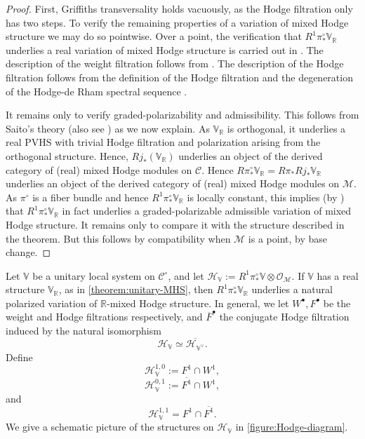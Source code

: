 \documentclass[12 pt]{amsart}
\theoremstyle{plain}
\theoremstyle{definition}
\theoremstyle{remark}
\numberwithin{equation}{section}
\begin{document}
\begin{proof}	
First, Griffiths transversality holds vacuously, as the Hodge filtration only has two steps. 
To verify the remaining properties of a variation of mixed Hodge structure
we may do so pointwise. 
Over a point, 
the verification that 
$R^1\pi^\circ_*\mathbb{V}_\mathbb{R}$ underlies a real variation of mixed Hodge
structure is carried out in 
\cite[Theorem, p. 152]{timmerscheidt:mixed-hodge-structure-for-unitary}.
The description of the weight filtration follows from \cite[Lemma
6.2]{timmerscheidt:mixed-hodge-structure-for-unitary}.
The description of the Hodge filtration follows from the definition of the
Hodge filtration and the degeneration of the Hodge-de Rham spectral sequence
\cite[Theorem 7.1(a)]{timmerscheidt:mixed-hodge-structure-for-unitary}.

It remains only to verify graded-polarizability and admissibility. This follows from Saito's theory \cite{saito1990mixed} (also see
\cite{schnell2014overview}) as we now explain. 
As $\mathbb{V}_\mathbb{R}$ is orthogonal, it underlies a real PVHS with trivial Hodge filtration and polarization arising from the orthogonal structure.
Hence, $Rj_*(\mathbb{V}_\mathbb{R})$ underlies an
object of the derived category of (real) mixed Hodge modules on $\mathscr{C}$. Hence
$R\pi^\circ_*\mathbb{V}_\mathbb{R}=R\pi_*Rj_*\mathbb{V}_\mathbb{R}$ 
underlies an object of the derived category of (real) mixed Hodge
modules on $\mathscr{M}$. As $\pi^\circ$ is a fiber bundle and hence $R^1\pi^\circ_*\mathbb{V}_\mathbb{R}$ is locally constant, this implies (by \cite[Theorem 21.1]{schnell2014overview}) that
$R^1\pi^\circ_*\mathbb{V}_\mathbb{R}$ in fact underlies a graded-polarizable
admissible variation of mixed Hodge structure. It remains only to compare it with
the structure described in the theorem. But this follows by compatibility
when $\mathscr{M}$ is a point, by base change.
\end{proof}
Let $\mathbb{V}$ be a unitary local system on $\mathscr{C}^\circ$, and let $\mathscr{H}_\mathbb{V}:=R^1\pi^\circ_*\mathbb{V}\otimes \mathscr{O}_\mathscr{M}$.   If $\mathbb{V}$ has a real structure $\mathbb{V}_\mathbb{R}$, as in \autoref{theorem:unitary-MHS}, then  $R^1\pi_*^\circ \mathbb{V}_\mathbb{R}$ underlies a natural polarized variation of $\mathbb{R}$-mixed Hodge structure. In general, we let $W^\bullet, F^\bullet$ be the weight and Hodge filtrations respectively, and $\overline{F}^\bullet$ the conjugate Hodge filtration induced by the natural isomorphism $$\mathscr{H}_{\mathbb{V}}\simeq \overline{\mathscr{H}_{\mathbb{V}^\vee}}.$$ Define $$\mathscr{H}_{\mathbb{V}}^{1,0}:= F^1\cap W^1,$$ $$\mathscr{H}^{0,1}_{\mathbb{V}} := \overline{F^1}\cap W^1,$$ and $$\mathscr{H}^{1,1}_{\mathbb{V}}=F^1\cap \overline{F^1}.$$ 
We give a schematic picture of the structures on $\mathscr{H}_{\mathbb{V}}$ in \autoref{figure:Hodge-diagram}.
\end{document}
